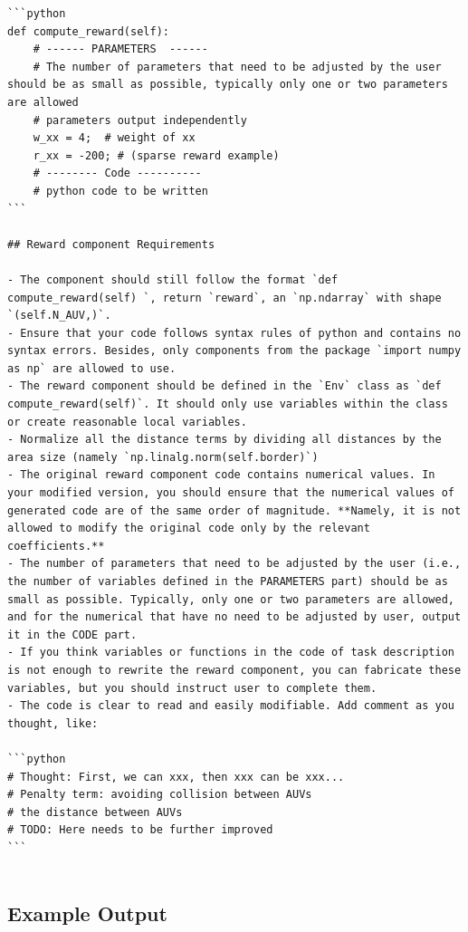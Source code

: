 \documentclass{article}
\begin{document}
\begin{verbatim}
```python
def compute_reward(self):
    # ------ PARAMETERS  ------
    # The number of parameters that need to be adjusted by the user should be as small as possible, typically only one or two parameters are allowed
    # parameters output independently
    w_xx = 4;  # weight of xx
    r_xx = -200; # (sparse reward example)
    # -------- Code ----------
    # python code to be written
```

## Reward component Requirements

- The component should still follow the format `def compute_reward(self) `, return `reward`, an `np.ndarray` with shape `(self.N_AUV,)`.
- Ensure that your code follows syntax rules of python and contains no syntax errors. Besides, only components from the package `import numpy as np` are allowed to use.
- The reward component should be defined in the `Env` class as `def compute_reward(self)`. It should only use variables within the class or create reasonable local variables.
- Normalize all the distance terms by dividing all distances by the area size (namely `np.linalg.norm(self.border)`)
- The original reward component code contains numerical values. In your modified version, you should ensure that the numerical values of generated code are of the same order of magnitude. **Namely, it is not allowed to modify the original code only by the relevant coefficients.**
- The number of parameters that need to be adjusted by the user (i.e., the number of variables defined in the PARAMETERS part) should be as small as possible. Typically, only one or two parameters are allowed, and for the numerical that have no need to be adjusted by user, output it in the CODE part.
- If you think variables or functions in the code of task description is not enough to rewrite the reward component, you can fabricate these variables, but you should instruct user to complete them.
- The code is clear to read and easily modifiable. Add comment as you thought, like:

```python
# Thought: First, we can xxx, then xxx can be xxx...
# Penalty term: avoiding collision between AUVs
# the distance between AUVs 
# TODO: Here needs to be further improved
```


\end{verbatim}


\subsection{Example Output} 
\end{document}
